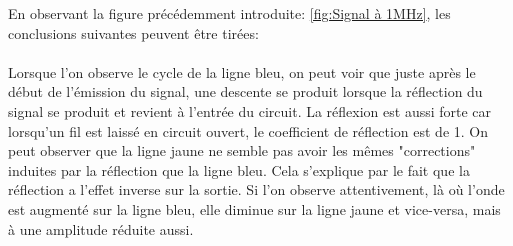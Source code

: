 En observant la figure précédemment introduite: \ref{fig:Signal à 1MHz}, les conclusions suivantes peuvent être tirées: \\
\\
Lorsque l'on observe le cycle de la ligne bleu, on peut voir que juste après le début de l'émission du signal, une descente se produit lorsque
la réflection du signal se produit et revient à l'entrée du circuit. La réflexion est aussi forte car lorsqu'un fil est laissé en circuit ouvert,
le coefficient de réflection est de 1. On peut observer que la ligne jaune ne semble pas avoir les mêmes "corrections" induites par la réflection
que la ligne bleu. Cela s'explique par le fait que la réflection a l'effet inverse sur la sortie. Si l'on observe attentivement, là où l'onde est
augmenté sur la ligne bleu, elle diminue sur la ligne jaune et vice-versa, mais à une amplitude réduite aussi.
